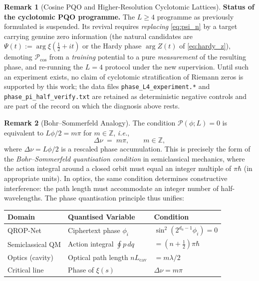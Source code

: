 \documentclass[11pt, a4paper]{article}
\theoremstyle{definition}
\newtheorem{remark}{Remark}[section]
\theoremstyle{plain}
\newcommand{\ie}{\textit{i.e.}}
\newcommand{\xif}{\xi}                      %
\newcommand{\Psip}{\Psi}                    %
\begin{document}
\begin{remark}[Cosine PQO and Higher-Resolution Cyclotomic Lattices]
\smallskip\noindent\textbf{Status of the cyclotomic PQO programme.} The
$L \geq 4$ programme as previously formulated is suspended. Its
revival requires \emph{replacing} \cref{eq:psi_n} by a target carrying
genuine zero information (the natural candidates are
$\Psip(t) := \arg \xif(\tfrac{1}{2}+it)$ or the Hardy phase
$\arg Z(t)$ of \cref{eq:hardy_z}), demoting $\mathcal{P}_{\cos}$ from a
\emph{training} potential to a pure \emph{measurement} of the resulting
phase, and re-running the $L=4$ protocol under the new supervision.
Until such an experiment exists, no claim of cyclotomic stratification
of Riemann zeros is supported by this work; the data files
\texttt{phase\_L4\_experiment.*} and \texttt{phase\_pi\_half\_verify.txt}
are retained as deterministic negative controls and are part of the
record on which the diagnosis above rests.
\end{remark}

\begin{remark}[Bohr--Sommerfeld Analogy]
\label{rem:bohr_sommerfeld}
The condition $\mathcal{P}(\phi; L) = 0$ is equivalent to
$L\phi/2 = m\pi$ for $m \in \mathbb{Z}$, \ie,
\begin{equation}
  \Delta\nu \;=\; m\pi, \qquad m \in \mathbb{Z},
  \label{eq:bohr_sommerfeld}
\end{equation}
where $\Delta\nu = L\phi/2$ is a rescaled phase accumulation. This is
precisely the form of the \textit{Bohr--Sommerfeld quantisation condition}
in semiclassical mechanics, where the action integral around a closed
orbit must equal an integer multiple of $\pi\hbar$
(in appropriate units). In optics, the same condition determines
constructive interference: the path length must accommodate an integer
number of half-wavelengths. The phase quantisation principle thus unifies:
\begin{center}
\begin{tabular}{lll}
\toprule
\textbf{Domain} & \textbf{Quantised Variable} & \textbf{Condition} \\
\midrule
QROP-Net        & Ciphertext phase $\phi_i$
                 & $\sin^2(2^{d_u-1}\phi_i) = 0$ \\
Semiclassical QM & Action integral $\oint p\,dq$
                 & $= (n + \tfrac{1}{2})\pi\hbar$ \\
Optics (cavity)  & Optical path length $nL_{\mathrm{cav}}$
                 & $= m\lambda/2$ \\
Critical line    & Phase of $\xif(s)$
                 & $\Delta\nu = m\pi$ \\
\bottomrule
\end{tabular}
\end{center}
\end{remark}
\end{document}
